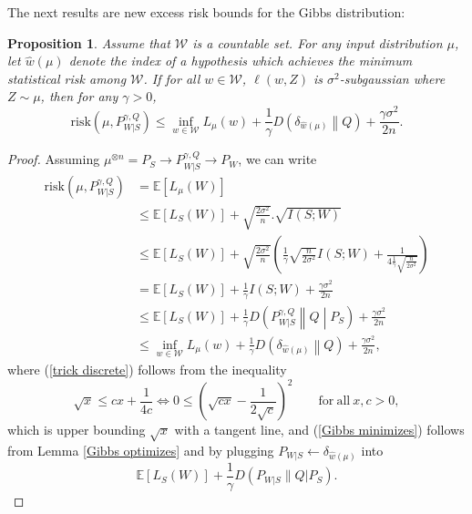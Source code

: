 \documentclass{article}
\newtheorem{proposition}{Proposition}
\newcommand{\E}{\mathbb{E}}
\newcommand{\risk}[0]{\mathrm{risk}}
\newcommand{\W}[0]{\mathcal{W}}
\begin{document}
The next results are new excess risk bounds for the Gibbs distribution:
\begin{proposition}\label{Gibbs excess _ statistical learning}
	Assume that $\W$ is a countable set. For any input distribution $\mu$, let $\widehat{w}(\mu)$ denote the index of a hypothesis which achieves the minimum statistical risk among $\W$. If for all $w\in\W$, $\ell(w,Z)$ is $\sigma^2$-subgaussian where $Z \sim \mu$, then for any $\gamma>0$,
	\begin{equation}
		\risk\left(\mu, P_{W|S}^{\gamma, Q}\right)\leq \inf_{w\in\W} L_{\mu}(w)+\frac{1}{\gamma}D\left(\delta_{\widehat{w}(\mu)}\middle\|Q\right)+\frac{\gamma\sigma^2}{2n}.  \label{Gibbs excess risk ineq}
	\end{equation}
\end{proposition}
\begin{proof}
	Assuming $\mu^{\otimes n}=P_S\to P_{W|S}^{\gamma, Q} \to P_W$, we can write 
	\begin{align}
		\risk\left(\mu, P_{W|S}^{\gamma, Q}\right)&=\E[L_{\mu}(W)] \nonumber\\
												 &\leq \E[L_S(W)]+\sqrt{\frac{2\sigma^2}{n}}.\sqrt{I(S;W)}\nonumber\\
												 &\leq \E[L_S(W)]+\sqrt{\frac{2\sigma^2}{n}}\left(\frac{1}{\gamma}\sqrt{\frac{n}{2\sigma^2}}I(S;W)+\frac{1}{4\frac{1}{\gamma} \sqrt{\frac{n}{2\sigma^2}}} \right)\label{trick discrete}\\
												 &=\E[L_S(W)]+\frac{1}{\gamma}I(S;W)+\frac{\gamma\sigma^2}{2n}\nonumber\\
												 &\leq \E[L_S(W)]+\frac{1}{\gamma}D\left(P_{W|S}^{\gamma,Q}\middle\|Q\middle|P_S\right)+\frac{\gamma\sigma^2}{2n}\nonumber\\
												 &\leq \inf_{w\in\W} L_{\mu}(w)+\frac{1}{\gamma}D\left(\delta_{\widehat{w}(\mu)}\middle\|Q\right)+\frac{\gamma\sigma^2}{2n}\label{Gibbs minimizes},
	\end{align}
	where (\ref{trick discrete}) follows from the inequality 
	\begin{equation}
		\sqrt{x}\leq cx+\frac{1}{4c} \iff 0\leq\left(\sqrt{cx}-\frac{1}{2\sqrt{c}}\right)^2 \qquad \mathrm{for\ all\ } x,c > 0,\label{square root upper bound 2}
	\end{equation}
 which is upper bounding $\sqrt{x}$ with a tangent line, and (\ref{Gibbs minimizes}) follows from Lemma \ref{Gibbs optimizes} and by plugging $P_{W|S}\gets \delta_{\widehat{w}(\mu)}$ into 
 \begin{equation}
 	\E[L_S(W)]+\frac{1}{\gamma}D(P_{W|S}\|Q|P_S).\nonumber
 \end{equation}
 \end{proof}
 
\end{document}
